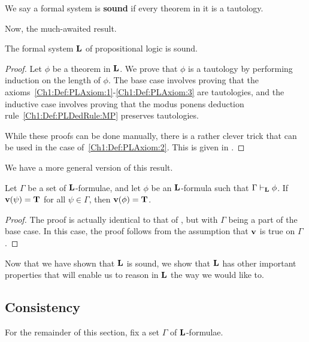 \begin{boxdefinition}[Soundness]
    We say a formal system is \textbf{sound} if every theorem in it is a tautology.
\end{boxdefinition}

Now, the much-awaited result.

\begin{boxtheorem}[Soundness of $\bL$]\label{Ch1:Thm:LSoundness}
    The formal system $\bL$ of propositional logic is sound.
\end{boxtheorem}
\begin{proof}
    Let $\phi$ be a theorem in $\bL$. We prove that $\phi$ is a tautology by performing induction on the length of $\phi$. The base case involves proving that the axioms~\ref{Ch1:Def:PLAxiom:1}-\ref{Ch1:Def:PLAxiom:3} are tautologies, and the inductive case involves proving that the modus ponens deduction rule~\ref{Ch1:Def:PLDedRule:MP} preserves tautologies.

    While these proofs can be done manually, there is a rather clever trick that can be used in the case of~\ref{Ch1:Def:PLAxiom:2}. This is given in \cite[Proof of 1.3.1]{2018LecNotes}. \sorry %
\end{proof}

We have a more general version of this result.

\begin{boxtheorem}
    Let $\Gamma$ be a set of $\bL$-formulae, and let $\phi$ be an $\bL$-formula such that $\Gamma \vdash_{\mathbf{L}} \phi$. If $\mathbf{v}\!\left( \psi \right) = \mathbf{T}$ for all $\psi \in \Gamma$, then $\mathbf{v}\!\left( \phi \right) = \mathbf{T}$.
\end{boxtheorem}
\begin{proof}
    The proof is actually identical to that of , but with $\Gamma$ being a part of the base case. In this case, the proof follows from the assumption that $\mathbf{v}$ is true on $\Gamma$.
\end{proof}

Now that we have shown that $\bL$ is sound, we show that $\bL$ has other important properties that will enable us to reason in $\bL$ the way we would like to.

\subsection{Consistency}

For the remainder of this section, fix a set $\Gamma$ of $\bL$-formulae.

